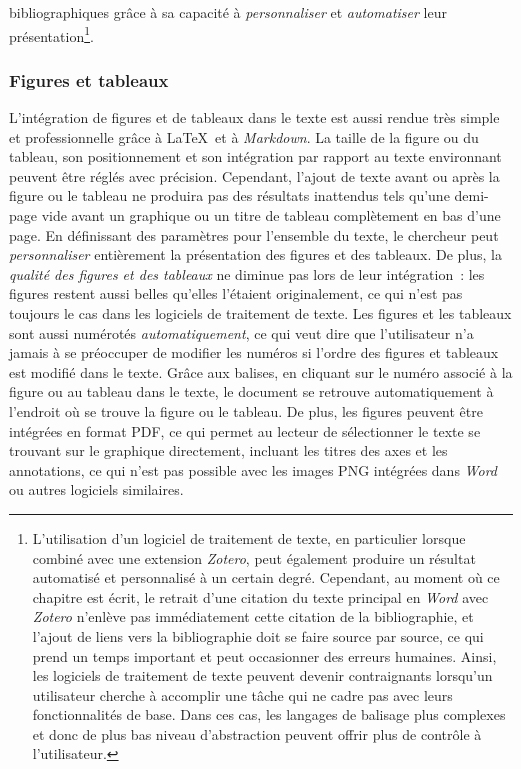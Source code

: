\documentclass[
  letterpaper,
  DIV=11,
  numbers=noendperiod,
  oneside]{scrreprt}
\begin{document}
bibliographiques grâce à sa capacité à \emph{personnaliser} et
\emph{automatiser} leur présentation\footnote{L'utilisation d'un
  logiciel de traitement de texte, en particulier lorsque combiné avec
  une extension \emph{Zotero}, peut également produire un résultat
  automatisé et personnalisé à un certain degré. Cependant, au moment où
  ce chapitre est écrit, le retrait d'une citation du texte principal en
  \emph{Word} avec \emph{Zotero} n'enlève pas immédiatement cette
  citation de la bibliographie, et l'ajout de liens vers la
  bibliographie doit se faire source par source, ce qui prend un temps
  important et peut occasionner des erreurs humaines. Ainsi, les
  logiciels de traitement de texte peuvent devenir contraignants
  lorsqu'un utilisateur cherche à accomplir une tâche qui ne cadre pas
  avec leurs fonctionnalités de base. Dans ces cas, les langages de
  balisage plus complexes et donc de plus bas niveau d'abstraction
  peuvent offrir plus de contrôle à l'utilisateur.}.

\hypertarget{figures-et-tableaux}{%
\subsubsection{Figures et tableaux}\label{figures-et-tableaux}}

L'intégration de figures et de tableaux dans le texte est aussi rendue
très simple et professionnelle grâce à \LaTeX{}~et à \emph{Markdown}. La
taille de la figure ou du tableau, son positionnement et son intégration
par rapport au texte environnant peuvent être réglés avec précision.
Cependant, l'ajout de texte avant ou après la figure ou le tableau ne
produira pas des résultats inattendus tels qu'une demi-page vide avant
un graphique ou un titre de tableau complètement en bas d'une page. En
définissant des paramètres pour l'ensemble du texte, le chercheur peut
\emph{personnaliser} entièrement la présentation des figures et des
tableaux. De plus, la \emph{qualité des figures et des tableaux} ne
diminue pas lors de leur intégration~: les figures restent aussi belles
qu'elles l'étaient originalement, ce qui n'est pas toujours le cas dans
les logiciels de traitement de texte. Les figures et les tableaux sont
aussi numérotés \emph{automatiquement}, ce qui veut dire que
l'utilisateur n'a jamais à se préoccuper de modifier les numéros si
l'ordre des figures et tableaux est modifié dans le texte. Grâce aux
balises, en cliquant sur le numéro associé à la figure ou au tableau
dans le texte, le document se retrouve automatiquement à l'endroit où se
trouve la figure ou le tableau. De plus, les figures peuvent être
intégrées en format PDF, ce qui permet au lecteur de sélectionner le
texte se trouvant sur le graphique directement, incluant les titres des
axes et les annotations, ce qui n'est pas possible avec les images PNG
intégrées dans \emph{Word} ou autres logiciels similaires.
\end{document}
